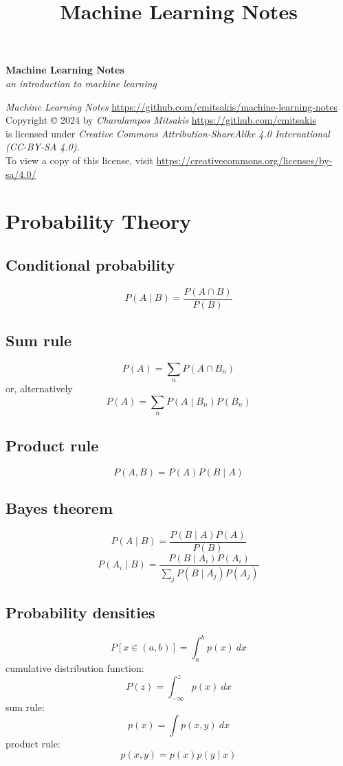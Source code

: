 \documentclass{report}
\title{Machine Learning Notes}
\begin{document}
\vspace*{2cm}
\begin{center}
	\Huge\textbf{Machine Learning Notes}\\
	\LARGE\textit{an introduction to machine learning}
\end{center}
\vspace*{2cm}

\textit{Machine Learning Notes} \url{https://github.com/cmitsakis/machine-learning-notes} \\
Copyright © 2024 by \textit{Charalampos Mitsakis} \url{https://github.com/cmitsakis} \\
is licensed under \textit{Creative Commons Attribution-ShareAlike 4.0 International (CC-BY-SA 4.0)}. \\
To view a copy of this license, visit \url{https://creativecommons.org/licenses/by-sa/4.0/}


\chapter{Probability Theory}

\section*{Conditional probability}
\[P(A \mid B) = \frac{P(A \cap B)}{P(B)}\]

\section*{Sum rule}
\[P(A)=\sum_n P(A \cap B_n)\]
or, alternatively
\[P(A)=\sum_n P(A \mid B_n) P(B_n)\]

\section*{Product rule}
\[P(A, B) = P(A) P(B \mid A)\]

\section*{Bayes theorem}
\[P(A \mid B) = \frac{P(B \mid A) P(A)}{P(B)}\]
\[P(A_i \mid B) = \frac{P(B \mid A_i) P(A_i)}{\sum\limits_j P(B \mid A_j) P(A_j)}\]

\section*{Probability densities}
\[P[x \in (a, b)] = \int_a^b p(x)\ dx\]
cumulative distribution function:
\[P(z) = \int_{-\infty}^z p(x)\ dx\]
sum rule:
\[p(x) = \int p(x, y)\ dx\]
product rule:
\[p(x, y) = p(x) p(y \mid x)\]
\end{document}
